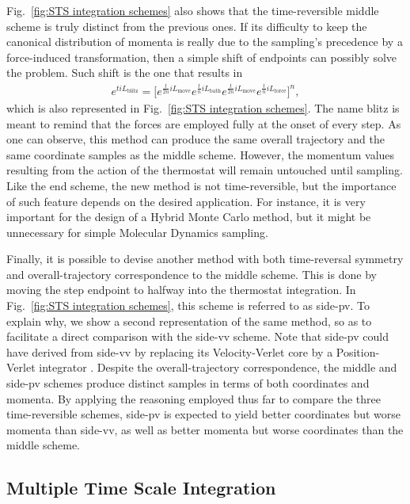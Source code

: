\documentclass[
    journal=jctcce,
    layout=twocolumn
]{achemso}
\newcommand{\Liu}{i\!L}
\begin{document}
Fig.~\ref{fig:STS integration schemes} also shows that the time-reversible middle scheme is truly distinct from the previous ones.
If its difficulty to keep the canonical distribution of momenta is really due to the sampling's precedence by a force-induced transformation, then a simple shift of endpoints can possibly solve the problem.
Such shift is the one that results in
\begin{multline}
\label{eq:STS blitz scheme propagator}
e^{t \Liu_\mathrm{blitz}} = \Big[
e^{\frac{t}{2n} \Liu_\mathrm{move}}
e^{\frac{t}{n} \Liu_\mathrm{bath}}
e^{\frac{t}{2n} \Liu_\mathrm{move}}
e^{\frac{t}{n} \Liu_\mathrm{force}}
\Big]^{n},
\end{multline}
which is also represented in Fig.~\ref{fig:STS integration schemes}.
The name blitz is meant to remind that the forces are employed fully at the onset of every step.
As one can observe, this method can produce the same overall trajectory and the same coordinate samples as the middle scheme.
However, the momentum values resulting from the action of the thermostat will remain untouched until sampling.
Like the end scheme, the new method is not time-reversible, but the importance of such feature depends on the desired application.
For instance, it is very important for the design of a Hybrid Monte Carlo method, but it might be unnecessary for simple Molecular Dynamics sampling.

Finally, it is possible to devise another method with both time-reversal symmetry and overall-trajectory correspondence to the middle scheme.
This is done by moving the step endpoint to halfway into the thermostat integration.
In Fig.~\ref{fig:STS integration schemes}, this scheme is referred to as side-pv.
To explain why, we show a second representation of the same method, so as to facilitate a direct comparison with the side-vv scheme.
Note that side-pv could have derived from side-vv by replacing its Velocity-Verlet core by a Position-Verlet integrator \cite{Tuckerman_1992}.
Despite the overall-trajectory correspondence, the middle and side-pv schemes produce distinct samples in terms of both coordinates and momenta.
By applying the reasoning employed thus far to compare the three time-reversible schemes, side-pv is expected to yield better coordinates but worse momenta than side-vv, as well as better momenta but worse coordinates than the middle scheme.

\subsection{Multiple Time Scale Integration}
\end{document}
